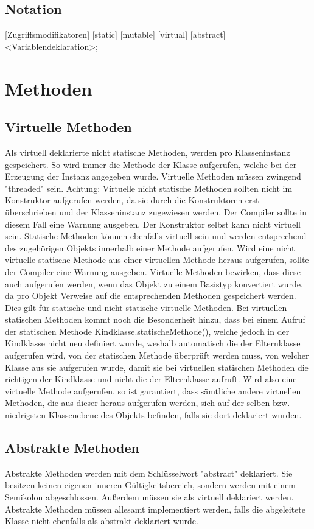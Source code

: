 \subsection{Notation}
[Zugriffsmodifikatoren] [static] [mutable] [virtual] [abstract] <Variablendeklaration>;

\section{Methoden}

\subsection{Virtuelle Methoden}
Als virtuell deklarierte nicht statische Methoden, werden pro Klasseninstanz gespeichert.
So wird immer die Methode der Klasse aufgerufen, welche bei der Erzeugung der Instanz angegeben wurde.
Virtuelle Methoden müssen zwingend "threaded" sein.
Achtung: Virtuelle nicht statische Methoden sollten nicht im Konstruktor aufgerufen werden, da sie durch die Konstruktoren
erst überschrieben und der Klasseninstanz zugewiesen werden. Der Compiler sollte in diesem Fall eine Warnung ausgeben.
Der Konstruktor selbst kann nicht virtuell sein.
Statische Methoden können ebenfalls virtuell sein und werden entsprechend des zugehörigen Objekts innerhalb einer Methode aufgerufen.
Wird eine nicht virtuelle statische Methode aus einer virtuellen Methode heraus aufgerufen, sollte der Compiler eine Warnung ausgeben.
Virtuelle Methoden bewirken, dass diese auch aufgerufen werden, wenn das Objekt zu einem Basistyp konvertiert wurde, da pro
Objekt Verweise auf die entsprechenden Methoden gespeichert werden. Dies gilt für statische und nicht statische virtuelle Methoden.
Bei virtuellen statischen Methoden kommt noch die Besonderheit hinzu, dass bei einem Aufruf der statischen Methode Kindklasse.statischeMethode(),
welche jedoch in der Kindklasse nicht neu definiert wurde, weshalb automatisch die der Elternklasse aufgerufen wird, von der statischen Methode
überprüft werden muss, von welcher Klasse aus sie aufgerufen wurde, damit sie bei virtuellen statischen Methoden die richtigen der Kindklasse und
nicht die der Elternklasse aufruft.
Wird also eine virtuelle Methode aufgerufen, so ist garantiert, dass sämtliche andere virtuellen Methoden, die aus dieser heraus aufgerufen werden,
sich auf der selben bzw. niedrigsten Klassenebene des Objekts befinden, falls sie dort deklariert wurden.

\subsection{Abstrakte Methoden}
Abstrakte Methoden werden mit dem Schlüsselwort "abstract" deklariert.
Sie besitzen keinen eigenen inneren Gültigkeitsbereich, sondern werden mit einem Semikolon abgeschlossen.
Außerdem müssen sie als virtuell deklariert werden.
Abstrakte Methoden müssen allesamt implementiert werden, falls die abgeleitete Klasse nicht ebenfalls als abstrakt deklariert wurde.

